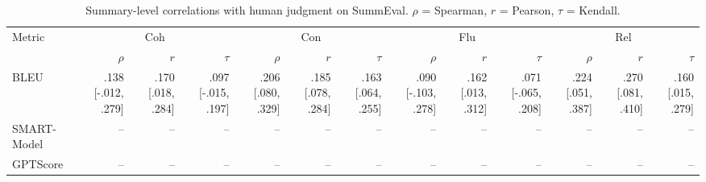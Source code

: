 \begin{table}[t]
\centering
\caption{Summary-level correlations with human judgment on SummEval. $\rho$ = Spearman, $r$ = Pearson, $\tau$ = Kendall.}
\label{tab:correlations_summary}
\begin{tabular}{lrrrrrrrrrrrr}
\toprule
Metric & \multicolumn{3}{c}{Coh} & \multicolumn{3}{c}{Con} & \multicolumn{3}{c}{Flu} & \multicolumn{3}{c}{Rel} \\
\cmidrule(lr){2-4} \cmidrule(lr){5-7} \cmidrule(lr){8-10} \cmidrule(lr){11-13} 
  & $\rho$ & $r$ & $\tau$ & $\rho$ & $r$ & $\tau$ & $\rho$ & $r$ & $\tau$ & $\rho$ & $r$ & $\tau$ \\
\midrule
BLEU & .138 {\scriptsize [-.012, .279]} & .170 {\scriptsize [.018, .284]} & .097 {\scriptsize [-.015, .197]} & .206 {\scriptsize [.080, .329]} & .185 {\scriptsize [.078, .284]} & .163 {\scriptsize [.064, .255]} & .090 {\scriptsize [-.103, .278]} & .162 {\scriptsize [.013, .312]} & .071 {\scriptsize [-.065, .208]} & .224 {\scriptsize [.051, .387]} & .270 {\scriptsize [.081, .410]} & .160 {\scriptsize [.015, .279]} \\
SMART-Model & -- & -- & -- & -- & -- & -- & -- & -- & -- & -- & -- & -- \\
GPTScore & -- & -- & -- & -- & -- & -- & -- & -- & -- & -- & -- & -- \\
\bottomrule
\end{tabular}
\end{table}
